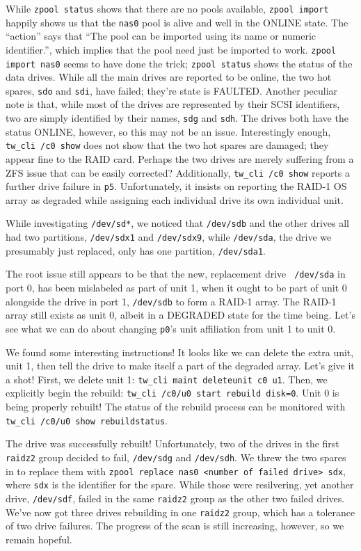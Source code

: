 \documentclass[12pt]{article}
\begin{document}
\qq While {\tt zpool status} shows that there are no pools available, {\tt zpool
  import} happily shows us that the {\tt nas0} pool is alive and well in the
ONLINE state. The ``action'' says that ``The pool can be imported using its name
or numeric identifier.'', which implies that the pool need just be imported to
work. {\tt zpool import nas0} seems to have done the trick; {\tt zpool status}
shows the status of the data drives. While all the main drives are reported to
be online, the two hot spares, {\tt sdo} and {\tt sdi}, have failed; they're
state is FAULTED. Another peculiar note is that, while most of the drives are
represented by their SCSI identifiers, two are simply identified by their names,
{\tt sdg} and {\tt sdh}. The drives both have the status ONLINE, however, so
this may not be an issue. Interestingly enough, {\tt tw\_cli /c0 show} does not
show that the two hot spares are damaged; they appear fine to the RAID
card. Perhaps the two drives are merely suffering from a ZFS issue that can be
easily corrected? Additionally, {\tt tw\_cli /c0 show} reports a further drive
failure in {\tt p5}. Unfortunately, it insists on reporting the RAID-1 OS array
as degraded while assigning each individual drive its own individual unit.

\qq While investigating {\tt /dev/sd*}, we noticed that {\tt /dev/sdb} and the
other drives all had two partitions, {\tt /dev/sdx1} and {\tt /dev/sdx9}, while
{\tt /dev/sda}, the drive we presumably just replaced, only has one partition,
{\tt /dev/sda1}.

\qq The root issue still appears to be that the new, replacement drive {\tt
  /dev/sda} in port 0, has been mislabeled as part of unit 1, when it ought to
be part of unit 0 alongside the drive in port 1, {\tt /dev/sdb} to form a RAID-1
array. The RAID-1 array still exists as unit 0, albeit in a DEGRADED state for
the time being. Let's see what we can do about changing {\tt p0}'s unit
affiliation from unit 1 to unit 0.

\qq We found some interesting instructions! It looks like we can delete the
extra unit, unit 1, then tell the drive to make itself a part of the degraded
array. Let's give it a shot! First, we delete unit 1: {\tt tw\_cli maint
  deleteunit c0 u1}. Then, we explicitly begin the rebuild: {\tt tw\_cli /c0/u0
  start rebuild disk=0}. Unit 0 is being properly rebuilt! The status of the
rebuild process can be monitored with {\tt tw\_cli /c0/u0 show rebuildstatus}.

\qq The drive was successfully rebuilt! Unfortunately, two of the drives in the
first {\tt raidz2} group decided to fail, {\tt /dev/sdg} and {\tt /dev/sdh}. We
threw the two spares in to replace them with {\tt zpool replace nas0 <number of
  failed drive> sdx}, where {\tt sdx} is the identifier for the spare. While
those were resilvering, yet another drive, {\tt /dev/sdf}, failed in the same
{\tt raidz2} group as the other two failed drives. We've now got three drives
rebuilding in one {\tt raidz2} group, which has a tolerance of two drive
failures. The progress of the scan is still increasing, however, so we remain
hopeful.
\end{document}
